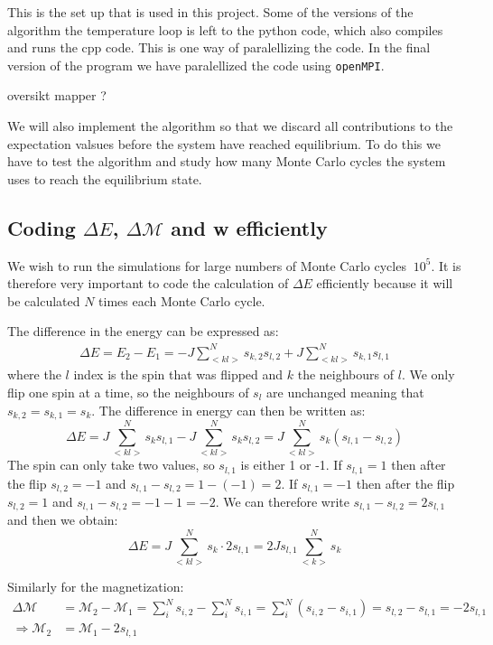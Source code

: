 \documentclass[11pt,a4wide]{article}
\begin{document}
This is the set up that is used in this project. Some of the versions of the algorithm the temperature loop is left to the python code, which also compiles and runs the cpp code. This is one way of paralellizing the code. In the final version of the program we have paralellized the code using \texttt{openMPI}. 

oversikt mapper ?


We will also implement the algorithm so that we discard all contributions to the expectation valsues before the system have reached equilibrium. To do this we have to test the algorithm and study how many Monte Carlo cycles the system uses to reach the equilibrium state. 

\subsection{Coding $\Delta E$, $\Delta \mathcal{M}$  and w efficiently}
We wish to run the simulations for large numbers of Monte Carlo cycles $~10^5$. It is therefore very important to code the calculation of $\Delta E$ efficiently because it will be calculated $N$ times each Monte Carlo cycle. 

The difference in the energy can be expressed as:
\begin{align*}
\Delta E = E_2 - E_1 = -J\sum_{<kl>}^N s_{k,2}s_{l,2} + J\sum_{<kl>}^N s_{k,1}s_{l,1}
\end{align*}
where the $l$ index is the spin that was flipped and $k$ the neighbours of $l$.  We only flip one spin at a time, so the neighbours of $s_l$ are unchanged meaning that $s_{k,2} = s_{k,1} = s_k$. The difference in energy can then be written as:
\[
\Delta E = J\sum_{<kl>}^N s_ks_{l,1} - J\sum_{<kl>}^N s_ks_{l,2} = J\sum_{<kl>}^N s_k(s_{l,1} - s_{l,2} )
\]
The spin can only take two values, so $s_{l,1}$ is either 1 or -1. If $s_{l,1}=1$ then after the flip $s_{l,2} = -1$ and $s_{l,1} - s_{l,2} = 1 - (-1) = 2$. If $s_{l,1}=-1$ then after the flip $s_{l,2} = 1$ and $s_{l,1} - s_{l,2} = -1 - 1 = -2$. We can therefore write $s_{l,1} - s_{l,2} = 2s_{l,1}$ and then we obtain:
\[
\Delta E = J\sum_{<kl>}^N s_k\cdot 2s_{l,1} = 2Js_{l,1}\sum_{<k>}^N s_k
\]

Similarly for the magnetization:
\begin{align*}
\Delta \mathcal{M} &= \mathcal{M}_2 - \mathcal{M}_1 = \sum_i^N s_{i,2} - \sum_i^N s_{i,1} = \sum_i^N (s_{i,2} -  s_{i,1}) = s_{l,2} - s_{l,1} = -2s_{l,1}\\
\Rightarrow \mathcal{M}_2 &= \mathcal{M}_1 - 2s_{l,1}
\end{align*}
\end{document}

